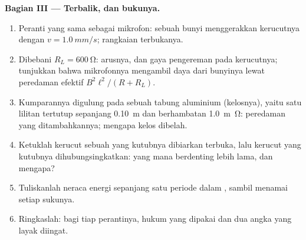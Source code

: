 \begin{problem}
\medskip
\noindent\textbf{Bagian III --- Terbalik, dan bukunya.}
\begin{enumerate}[resume]
  \item Peranti yang sama sebagai mikrofon: sebuah bunyi menggerakkan kerucutnya dengan
        $v = \qty{1.0}{mm/s}$;  rangkaian terbukanya.
  \item Dibebani $R_L = \qty{600}{\ohm}$: arusnya, dan gaya pengereman
        pada kerucutnya; tunjukkan bahwa mikrofonnya mengambil daya dari bunyinya
        lewat peredaman efektif $B^2\ell^2/(R + R_L)$.
  \item Kumparannya digulung pada sebuah tabung aluminium (kelosnya), yaitu
        satu lilitan tertutup sepanjang \qty{0.10}{m} dan berhambatan \qty{1.0}{m\ohm}:
        peredaman yang ditambahkannya; mengapa kelos dibelah.
  \item Ketuklah kerucut sebuah  yang kutubnya dibiarkan terbuka,
        lalu kerucut yang kutubnya dihubungsingkatkan: yang mana berdenting lebih lama,
        dan mengapa?
  \item Tuliskanlah neraca energi  sepanjang satu periode dalam
        , sambil menamai setiap sukunya.
  \item Ringkaslah: bagi tiap perantinya, hukum yang dipakai dan dua angka
        yang layak diingat.
\end{enumerate}
\end{problem}
